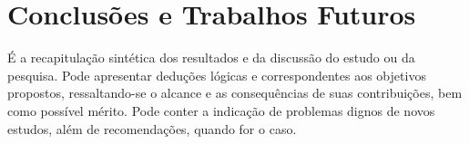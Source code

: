 \chapter{Conclusões e Trabalhos Futuros}

É a recapitulação sintética dos resultados e da discussão do estudo ou da pesquisa. Pode apresentar deduções lógicas e correspondentes aos objetivos propostos, ressaltando-se o alcance e as consequências de suas contribuições, bem como possível mérito. Pode conter a indicação de problemas dignos de novos estudos, além de recomendações, quando for o caso.